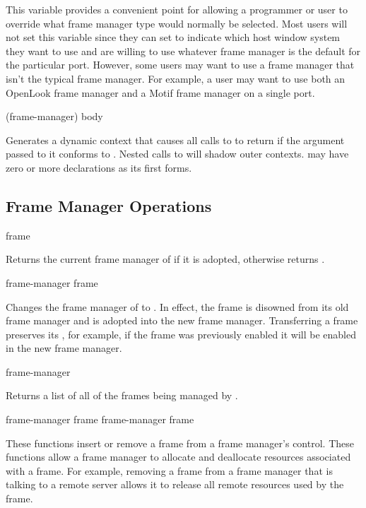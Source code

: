 
This variable provides a convenient point for allowing a programmer or user to
override what frame manager type would normally be selected.  Most users will
not set this variable since they can set  to indicate
which host window system they want to use and are willing to use whatever frame
manager is the default for the particular port.  However, some users may want to
use a frame manager that isn't the typical frame manager.  For example, a user
may want to use both an OpenLook frame manager and a Motif frame manager on a
single port.

 {(frame-manager) \body body}

Generates a dynamic context that causes all calls to  to
return  if the  argument passed to it conforms to
.  Nested calls to  will shadow outer
contexts.   may have zero or more declarations as its first forms.


\subsection {Frame Manager Operations}

 {frame} 

Returns the current frame manager of  if it is adopted, otherwise
returns .

 {frame-manager frame}

Changes the frame manager of  to .  In effect, the
frame is disowned from its old frame manager and is adopted into the new frame
manager.  Transferring a frame preserves its , for example, if
the frame was previously enabled it will be enabled in the new frame manager.

 {frame-manager} 

Returns a list of all of the frames being managed by .
\ReadOnly

 {frame-manager frame}
 {frame-manager frame} 

These functions insert or remove a frame from a frame manager's control.  These
functions allow a frame manager to allocate and deallocate resources associated
with a frame.  For example, removing a frame from a frame manager that is
talking to a remote server allows it to release all remote resources used by the
frame.

